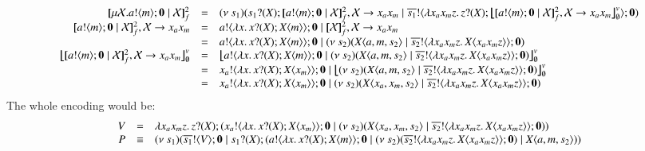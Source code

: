 \[
	\begin{array}{rcl}
		\pmapp{\recp{X}{\bout{a}{m} \inact \Par \rvar{X}}}{2}{f} & = &
		\newsp{s_1}{ \binp{s_1}{X} \pmapp{\bout{a}{m} \inact \Par \rvar{X}}{2}{f, \rvar{X} \rightarrow x_ax_m} \Par \bout{\dual{s_1}}{ \abs{x_a x_m z} \binp{z}{X} \auxmapp{\pmapp{\bout{a}{m} \inact \Par \rvar{X}}{2}{f, \rvar{X} \rightarrow x_ax_m}}{v}{\es} } \inact}
		\\

		\pmapp{\bout{a}{m} \inact \Par \rvar{X}}{2}{f, \rvar{X} \rightarrow x_ax_m} &=&
		\bout{a}{\abs{x}{\binp{x}{X} \appl{X}{m}}} \inact \Par \pmapp{\rvar{X}}{2}{f, \rvar{X} \rightarrow x_ax_m}
		\\
		&=& \bout{a}{\abs{x}{\binp{x}{X} \appl{X}{m}}} \inact \Par \newsp{s_2}{\appl{X}{a,m, s_2}  \Par \bout{\dual{s_2}}{\abs{x_a x_m z}{\appl{X}{x_a x_m z}}} \inact}
		\\

		\auxmapp{\pmapp{\bout{a}{m} \inact \Par \rvar{X}}{2}{f, \rvar{X} \rightarrow x_ax_m}}{v}{\es} &=&
		\auxmapp{\bout{a}{\abs{x}{\binp{x}{X} \appl{X}{m}}} \inact \Par  \newsp{s_2}{\appl{X}{a,m, s_2}  \Par \bout{\dual{s_2}}{\abs{x_a x_m z}{\appl{X}{x_a x_m z}}} \inact}}{v}{\es}
		\\
		& = & \bout{x_a}{\abs{x}{\binp{x}{X} \appl{X}{x_m}}} \inact \Par \auxmapp{\newsp{s_2}{\appl{X}{a,m, s_2}  \Par \bout{\dual{s_2}}{\abs{x_a x_m z}{\appl{X}{x_a x_m z}}} \inact}}{v}{\es}
		\\
		& = & \bout{x_a}{\abs{x}{\binp{x}{X} \appl{X}{x_m}}} \inact \Par \newsp{s_2}{\appl{X}{x_a,x_m, s_2}  \Par \bout{\dual{s_2}}{\abs{x_a x_m z}{\appl{X}{x_a x_m z}}} \inact}
	\end{array}
\]
\noi The whole encoding would be:
\[
	\begin{array}{rcl}
		V & = & \lambda x_a x_m z.\,z ? (X) ; (x_a ! \langle \lambda x.\,x ? (X) ; X\langle x_m \rangle \rangle ; \mathbf{0} \;|\; (\nu\ s_2)(X\langle x_a,x_m, s_2 \rangle  \;|\; \overline{s_2} ! \langle \lambda x_a x_m z.\,X\langle x_a x_m z \rangle \rangle ; \mathbf{0}))\\
		P & \equiv &
		(\nu\ s_1)(\overline{s_1} ! \langle V \rangle ; \mathbf{0} \;|\; s_1 ? (X) ; (a ! \langle \lambda x.\,x ? (X) ; X\langle m \rangle \rangle ; \mathbf{0} \;|\;  (\nu\ s_2)(\overline{s_2} ! \langle \lambda x_a x_m z.\,X\langle x_a x_m z \rangle \rangle ; \mathbf{0}) \;|\; X\langle a,m, s_2 \rangle))
	\end{array}
\]

